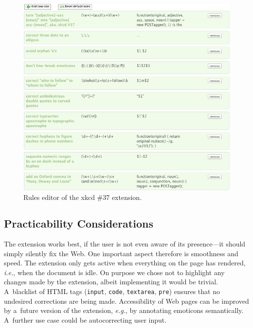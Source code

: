\documentclass{sig-alternate}
\let\oldemph\emph
\renewcommand{\emph}[1]{\oldemph{\fontsize{9}{9}\selectfont #1}}
\begin{document}
\begin{figure}[h!]
\vspace{+10pt}
\begin{center}
   \includegraphics[width=1\linewidth]{./editor.png}
\end{center}
   \caption{Rules editor of the xkcd \#37 extension.}
\label{fig:editor}
\end{figure}

\subsection{Practicability Considerations}
The extension works best, if the user is not even aware of its
presence---it should simply silently fix the Web.
One important aspect therefore is smoothness and speed.
The extension only gets active when everything on the page has rendered, \emph{i.e.},
when the document is idle.
On purpose we chose not to highlight any changes made by the extension,
albeit implementing it would be trivial.
A~blacklist of HTML tags (\texttt{input}, \texttt{code}, \texttt{textarea}, \texttt{pre})
ensures that no undesired corrections are being made.
Accessibility of Web pages can be improved by a~future version of the extension, \emph{e.g.},
by annotating emoticons semantically.
A~further use case could be autocorrecting user input.

\addtocounter{footnote}{1}
\end{document}
